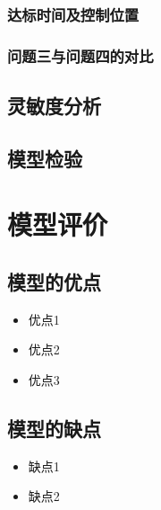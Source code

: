 \documentclass[withoutpreface,bwprint]{cumcmthesis}
\begin{document}
\subsubsection{达标时间及控制位置}
\subsubsection{问题三与问题四的对比}

\subsection{灵敏度分析}


\subsection{模型检验}


\endgroup




























\section{模型评价}

\subsection{模型的优点}
\begin{itemize}[itemindent=2em]
\item 优点1
\item 优点2
\item 优点3
\end{itemize}

\subsection{模型的缺点}
\begin{itemize}[itemindent=2em]
\item 缺点1
\item 缺点2
\end{itemize}
\end{document}
